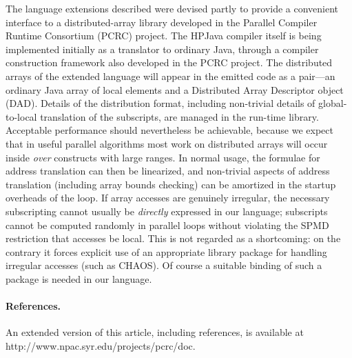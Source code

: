 The language extensions described were devised partly to provide a
convenient interface to a distributed-array library developed in the
Parallel Compiler Runtime Consortium (PCRC) project.  The HPJava
compiler itself is being implemented initially as a translator to
ordinary Java, through a compiler construction framework also developed
in the PCRC project.  The distributed arrays of the extended language
will appear in the emitted code as a pair---an ordinary Java array of
local elements and a Distributed Array Descriptor object (DAD).
Details of the distribution format, including non-trivial details of
global-to-local translation of the subscripts, are managed in the
run-time library.  Acceptable performance should nevertheless be
achievable, because we expect that in useful parallel algorithms most
work on distributed arrays will occur inside {\em over} constructs with
large ranges.  In normal usage, the formulae for address translation
can then be linearized, and non-trivial aspects of address translation
(including array bounds checking) can be amortized in the startup
overheads of the loop.  If array accesses are genuinely
irregular, the necessary subscripting cannot usually be {\em directly}
expressed in our language; subscripts cannot be computed
randomly in parallel loops without violating the SPMD
restriction that accesses be local.  This is not regarded as a
shortcoming: on the contrary it forces explicit use of an appropriate
library package for handling irregular accesses (such as CHAOS).  Of
course a suitable binding of such a package is needed in our language.

\paragraph{References.}
An extended version of this article, including references, is available at
http://www.npac.syr.edu/projects/pcrc/doc.



